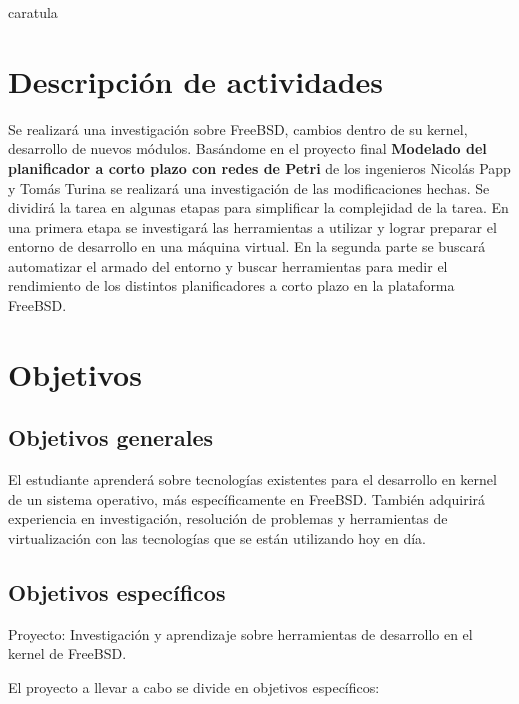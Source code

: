 \documentclass[a4paper, 11pt]{article}
\begin{document}
{caratula}

\section*{Descripción de actividades}

\vspace{0.4cm}
\large
Se realizará una investigación sobre FreeBSD, cambios dentro de su kernel, desarrollo de nuevos módulos. Basándome en el proyecto final \textbf{Modelado del planificador a corto plazo con redes de Petri} de los ingenieros Nicolás Papp y Tomás Turina se realizará una investigación de las modificaciones hechas. Se dividirá la tarea en algunas etapas para simplificar la complejidad de la tarea.
En una primera etapa se investigará las herramientas a utilizar y lograr preparar el entorno de desarrollo en una máquina virtual. En la segunda parte se buscará automatizar el armado del entorno y buscar herramientas para medir el rendimiento de los distintos planificadores a corto plazo en la plataforma FreeBSD.

\newpage

\section*{Objetivos}
\subsection*{Objetivos generales}

El estudiante aprenderá sobre tecnologías existentes para el desarrollo en kernel de un sistema operativo, más específicamente en FreeBSD. También adquirirá experiencia en investigación, resolución de problemas y herramientas de virtualización con las tecnologías que se están utilizando hoy en día.

\vspace{0.7cm}
\subsection*{Objetivos específicos}

Proyecto: Investigación y aprendizaje sobre herramientas de desarrollo en el kernel de FreeBSD.

\vspace{0.5cm}
El proyecto a llevar a cabo se divide en objetivos específicos:
\end{document}
